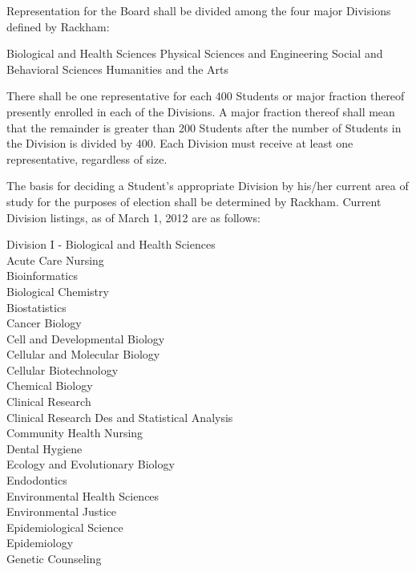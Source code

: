 \begin{enumsubsection}
\itemnotoc Representation for the Board shall be divided among the four major 
Divisions defined by Rackham: 
\begin{enumsubsubsection}
\itemnotoc Biological and Health Sciences 
\itemnotoc Physical Sciences and Engineering 
\itemnotoc Social and Behavioral Sciences 
\itemnotoc Humanities and the Arts 
\end{enumsubsubsection}
\itemnotoc There shall be one representative for each 400 Students or major fraction 
thereof presently enrolled in each of the Divisions. A major fraction thereof 
shall mean that the remainder is greater than 200 Students after the number 
of Students in the Division is divided by 400. Each Division must receive at 
least one representative, regardless of size.
\begin{enumsubsubsection}
\itemnotoc The basis for deciding a Student's appropriate Division by his/her 
current area of study for the purposes of election shall be 
determined by Rackham. Current Division listings, as of March 1, 
2012 are as follows: 
\begin{description}
\item{Division I - Biological and Health Sciences} \\
Acute Care Nursing\\
Bioinformatics\\
Biological Chemistry\\
Biostatistics\\
Cancer Biology\\
Cell and Developmental Biology\\
Cellular and Molecular Biology\\
Cellular Biotechnology\\
Chemical Biology\\
Clinical Research\\
Clinical Research Des and Statistical Analysis\\
Community Health Nursing\\
Dental Hygiene\\
Ecology and Evolutionary Biology\\
Endodontics\\
Environmental Health Sciences\\
Environmental Justice\\
Epidemiological Science\\
Epidemiology\\
Genetic Counseling\\

\end{description}
\end{enumsubsubsection}
\end{enumsubsection}
